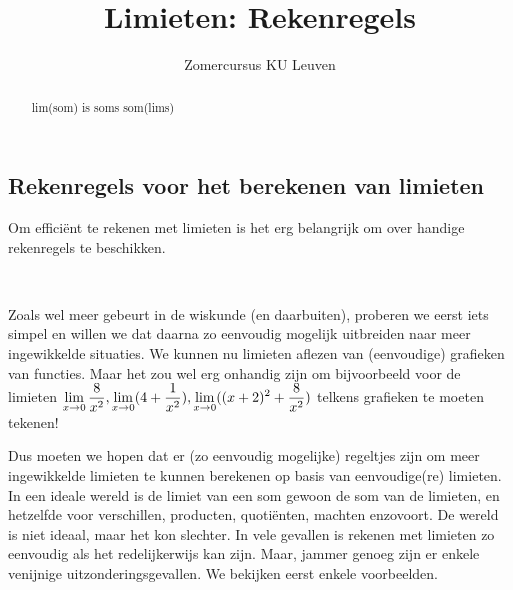 \documentclass{ximera}
\author{Zomercursus KU Leuven}
\title{Limieten: Rekenregels}
\begin{document}
\begin{abstract}
	lim(som) is soms som(lims) 
\end{abstract}
\maketitle

\subsection{Rekenregels voor het berekenen van limieten}

Om efficiënt te rekenen  met limieten is het erg belangrijk om over handige rekenregels te beschikken.

\begin{expandable}
\begin{uitweiding} \ 
	
Zoals wel meer gebeurt in de wiskunde (en daarbuiten), proberen we eerst iets simpel en willen we dat daarna zo eenvoudig mogelijk uitbreiden naar meer ingewikkelde situaties. We kunnen nu limieten aflezen van (eenvoudige) grafieken van functies. Maar het zou wel erg onhandig zijn om bijvoorbeeld voor de limieten $\limx \frac{8}{x^2}, \limx (4+\frac{1}{x^2}), \limx ((x+2)^2 + \frac{8}{x^2})$ telkens grafieken te moeten tekenen! %

Dus moeten we hopen dat er (zo eenvoudig mogelijke) regeltjes zijn om meer ingewikkelde limieten te kunnen berekenen op basis van eenvoudige(re) limieten. In een ideale wereld is de limiet van een som gewoon de som van de limieten, en hetzelfde voor verschillen, producten, quotiënten, machten enzovoort. De wereld is niet ideaal, maar het kon slechter. In vele gevallen is rekenen met limieten  zo eenvoudig als het redelijkerwijs kan zijn. Maar, jammer genoeg zijn er enkele venijnige uitzonderingsgevallen. We bekijken eerst enkele voorbeelden.
\end{uitweiding}
\end{expandable}
\end{document}
